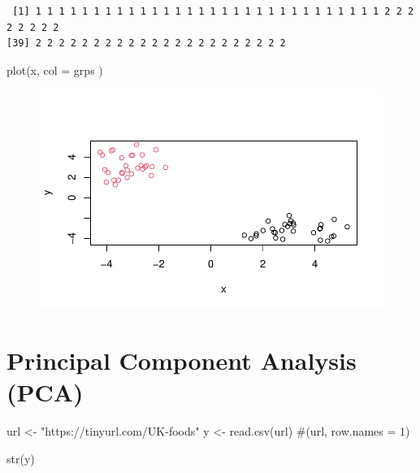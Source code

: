 \documentclass[
  letterpaper,
  DIV=11,
  numbers=noendperiod]{scrartcl}
\newenvironment{Shaded}{\begin{snugshade}}{\end{snugshade}}
\newcommand{\AttributeTok}[1]{\textcolor[rgb]{0.40,0.45,0.13}{#1}}
\newcommand{\CommentTok}[1]{\textcolor[rgb]{0.37,0.37,0.37}{#1}}
\newcommand{\FunctionTok}[1]{\textcolor[rgb]{0.28,0.35,0.67}{#1}}
\newcommand{\NormalTok}[1]{\textcolor[rgb]{0.00,0.23,0.31}{#1}}
\newcommand{\OtherTok}[1]{\textcolor[rgb]{0.00,0.23,0.31}{#1}}
\newcommand{\StringTok}[1]{\textcolor[rgb]{0.13,0.47,0.30}{#1}}
\begin{document}
\begin{verbatim}
 [1] 1 1 1 1 1 1 1 1 1 1 1 1 1 1 1 1 1 1 1 1 1 1 1 1 1 1 1 1 1 1 2 2 2 2 2 2 2 2
[39] 2 2 2 2 2 2 2 2 2 2 2 2 2 2 2 2 2 2 2 2 2 2
\end{verbatim}

\begin{Shaded}
\begin{Highlighting}[]
\FunctionTok{plot}\NormalTok{(x, }\AttributeTok{col =}\NormalTok{ grps )}
\end{Highlighting}
\end{Shaded}

\begin{figure}[H]

{\centering \includegraphics{Class07_files/figure-pdf/unnamed-chunk-12-1.pdf}

}

\end{figure}

\hypertarget{principal-component-analysis-pca}{%
\section{Principal Component Analysis
(PCA)}\label{principal-component-analysis-pca}}

\begin{Shaded}
\begin{Highlighting}[]
\NormalTok{url }\OtherTok{\textless{}{-}} \StringTok{"https://tinyurl.com/UK{-}foods"}
\NormalTok{y }\OtherTok{\textless{}{-}} \FunctionTok{read.csv}\NormalTok{(url) }\CommentTok{\#(url, row.names = 1)}

\FunctionTok{str}\NormalTok{(y)}
\end{Highlighting}
\end{Shaded}
\end{document}
